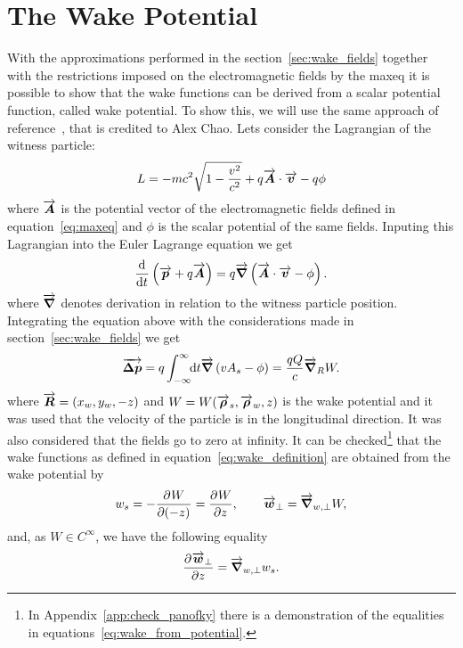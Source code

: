 \section{The Wake Potential}

    With the approximations performed in the section~\ref{sec:wake_fields} together with the restrictions imposed on the electromagnetic fields by the \gls{maxeq} it is possible to show that the wake functions can be derived from a scalar potential function, called wake potential. To show this, we will use the same approach of reference~\cite{Stupakov2000a}, that is credited to Alex Chao. Lets consider the Lagrangian of the witness particle:
    \begin{align}
  	  	L = -mc^2\sqrt{1 - \frac{v^2}{c^2}} + q\overrightarrow{\boldsymbol{A}}\cdot\overrightarrow{\boldsymbol{v}} - q\phi
    \end{align}
    where $\overrightarrow{\boldsymbol{A}}$ is the potential vector of the electromagnetic fields defined in equation~\eqref{eq:maxeq} and $\phi$ is the scalar potential of the same fields. Inputing this Lagrangian into the Euler Lagrange equation we get
    \begin{align}
	  	\frac{\mathrm{d}^{{}}}{\mathrm{d} t^{{}}} \left(\overrightarrow{\boldsymbol{p}} + q\overrightarrow{\boldsymbol{A}}\right) = q\overrightarrow{\boldsymbol{\nabla}}\left( \overrightarrow{\boldsymbol{A}}\cdot\overrightarrow{\boldsymbol{v}} - \phi\right).
    \end{align}
    where $\overrightarrow{\boldsymbol{\nabla}}$ denotes derivation in relation to the witness particle position. Integrating the equation above with the considerations made in section~\ref{sec:wake_fields} we get
    \begin{align}
   		\overrightarrow{\boldsymbol{\Delta p}} = q\int_{-\infty}^{\infty}\!\!\text{d}t \overrightarrow{\boldsymbol{\nabla}}\left(vA_s - \phi \right) = \frac{qQ}{c} \overrightarrow{\boldsymbol{\nabla}}_R W.
    \end{align}
    where $\overrightarrow{\boldsymbol{R}} =(x_w, y_w, -z)$ and $W = W(\overrightarrow{\boldsymbol{\rho}}_s, \overrightarrow{\boldsymbol{\rho}}_w, z)$ is the wake potential and it was used that the velocity of the particle is in the longitudinal direction. It was also considered that the fields go to zero at infinity. It can be checked\footnote{In Appendix~\ref{app:check_panofky} there is a demonstration of the equalities in equations~\eqref{eq:wake_from_potential}.} that the wake functions as defined in equation~\eqref{eq:wake_definition} are obtained from the wake potential by
    \begin{align}\label{eq:wake_from_potential}
   		w_s = - \frac{\partial^{{}}W}{\partial (-z)^{{}}} = \frac{\partial^{{}}W}{\partial z^{{}}},\qquad \overrightarrow{\boldsymbol{w}}_\perp = \overrightarrow{\boldsymbol{\nabla}}_{w,\perp} W,
    \end{align}
    and, as $W \in C^{\infty}$, we have the following equality
    \begin{align}\label{eq:panofsky_wenzel_theorem}
   		\frac{\partial^{{}}\overrightarrow{\boldsymbol{w}}_\perp}{\partial z^{{}}} = \overrightarrow{\boldsymbol{\nabla}}_{w,\perp} w_s.
    \end{align}
